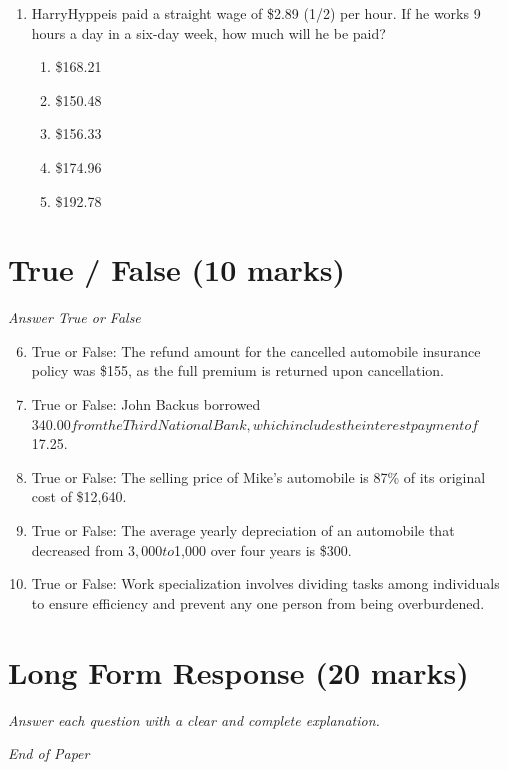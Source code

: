 \documentclass[12pt]{article}
\begin{document}
\begin{enumerate}[label=\arabic*.]
\begin{enumerate}[label=(\alph*)]
    \item \$225
    \item \$175
    \item \$195
\end{enumerate}
\item HarryHyppeis paid a straight wage of \$2.89 (1/2) per hour. If he works 9 hours a day in a
six-day week, how much will he be paid?
\begin{enumerate}[label=(\alph*)]
    \item \$168.21
    \item \$150.48
    \item \$156.33
    \item \$174.96
    \item \$192.78
\end{enumerate}
\end{enumerate}

\section*{True / False (10 marks)}
\textit{Answer True or False}
\begin{enumerate}[label=\arabic*.]
\setcounter{enumi}{5}
\item True or False: The refund amount for the cancelled automobile insurance policy was \$155, as the full premium is returned upon cancellation.
\item True or False: John Backus borrowed $340.00 from the Third National Bank, which includes the interest payment of $17.25.
\item True or False: The selling price of Mike's automobile is 87\% of its original cost of \$12,640.
\item True or False: The average yearly depreciation of an automobile that decreased from $3,000 to $1,000 over four years is \$300.
\item True or False: Work specialization involves dividing tasks among individuals to ensure efficiency and prevent any one person from being overburdened.
\end{enumerate}

\section*{Long Form Response (20 marks)}
\textit{Answer each question with a clear and complete explanation.}

\vfill
\noindent\textit{End of Paper}
\end{document}
